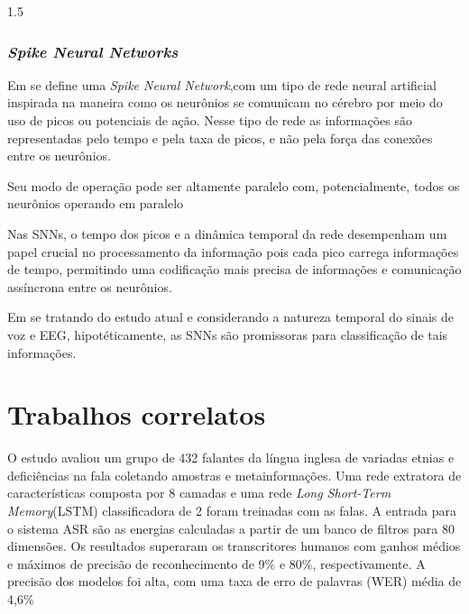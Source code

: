 \documentclass[a4paper,12pt,openright,oneside]{book}
\newenvironment{myenv}[1]
  {\begin{spacing}{#1}}
  {\end{spacing}}
\begin{document}
\begin{myenv}{1.5}
					\subsubsection{\textit{Spike Neural Networks}}
						\par Em \cite{kasabov2018time} se define uma \textit{Spike Neural Network},com um tipo de rede neural artificial inspirada na maneira como os neurônios se comunicam no cérebro por meio do uso de picos ou potenciais de ação. Nesse tipo de rede as informações são representadas pelo tempo e pela taxa de picos, e não pela força das conexões entre os neurônios.
						
						\par Seu modo de operação pode ser altamente paralelo com, potencialmente, todos os neurônios operando em paralelo
					
						\par Nas SNNs, o tempo dos picos e a dinâmica temporal da rede desempenham um papel crucial no processamento da informação pois cada pico carrega informações de tempo, permitindo uma codificação mais precisa de informações e comunicação assíncrona entre os neurônios.
					
						\par Em se tratando do estudo atual e considerando a natureza temporal do sinais de voz e EEG, hipotéticamente, as SNNs são promissoras para classificação de tais informações.
				
			\section{Trabalhos correlatos}
				\label{sec:trabcorrelatos}
		
				\par O estudo \cite{WOS:000841879504172} avaliou um grupo de 432 falantes da língua inglesa de variadas etnias e deficiências na fala coletando amostras e metainformações. Uma rede extratora de características composta por 8 camadas e uma rede \textit{Long Short-Term Memory}(LSTM) classificadora de 2 foram treinadas com as falas. A entrada para o sistema ASR são as energias calculadas a partir de um banco de filtros para 80 dimensões. Os resultados superaram os transcritores humanos com ganhos médios e máximos de precisão de reconhecimento de 9\% e 80\%, respectivamente. A precisão dos modelos foi alta, com uma taxa de erro de palavras (WER) média de 4,6\%\newline
				

\end{myenv}
\end{document}
